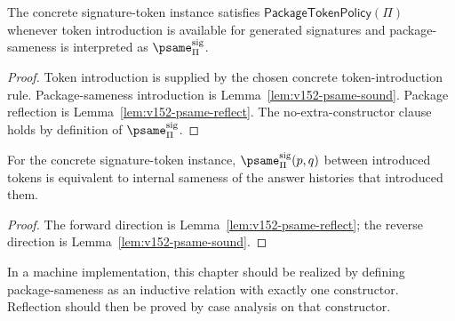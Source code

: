 \begin{theorem}
\label{thm:v152-concrete-package-token-policy}
The concrete signature-token instance satisfies \(\mathsf{PackageTokenPolicy}(\Pi)\) whenever token introduction is available for generated signatures and package-sameness is interpreted as \(\psame_{\Pi}^{\mathrm{sig}}\).
\end{theorem}

\begin{proof}
Token introduction is supplied by the chosen concrete token-introduction rule. Package-sameness introduction is Lemma~\ref{lem:v152-psame-sound}. Package reflection is Lemma~\ref{lem:v152-psame-reflect}. The no-extra-constructor clause holds by definition of \(\psame_{\Pi}^{\mathrm{sig}}\).
\end{proof}

\begin{corollary}
For the concrete signature-token instance, \(\psame_{\Pi}^{\mathrm{sig}}(p,q)\) between introduced tokens is equivalent to internal sameness of the answer histories that introduced them.
\end{corollary}

\begin{proof}
The forward direction is Lemma~\ref{lem:v152-psame-reflect}; the reverse direction is Lemma~\ref{lem:v152-psame-sound}.
\end{proof}

\begin{remark}
In a machine implementation, this chapter should be realized by defining package-sameness as an inductive relation with exactly one constructor. Reflection should then be proved by case analysis on that constructor.
\end{remark}
